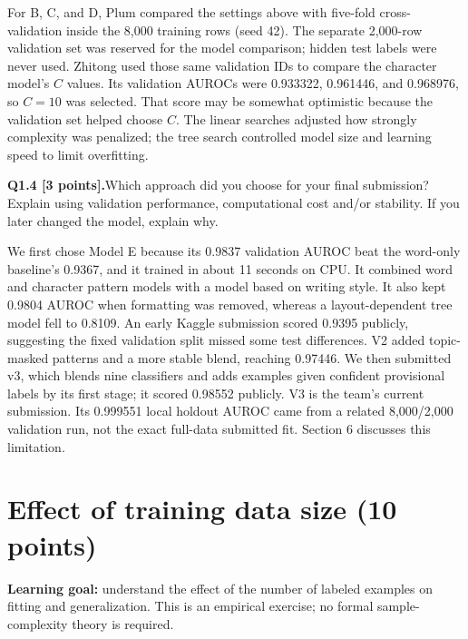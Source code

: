 \documentclass[11pt,letterpaper]{article}
\newcommand{\question}[2]{\needspace{4\baselineskip}\par\addvspace{0.45em}\noindent\textbf{#1}\quad #2\par\nobreak\vspace{0.1em}}
\begin{document}
For B, C, and D, Plum compared the settings above with five-fold cross-validation inside the 8,000 training rows (seed 42). The separate 2,000-row validation set was reserved for the model comparison; hidden test labels were never used. Zhitong used those same validation IDs to compare the character model's $C$ values. Its validation AUROCs were 0.933322, 0.961446, and 0.968976, so $C=10$ was selected. That score may be somewhat optimistic because the validation set helped choose $C$. The linear searches adjusted how strongly complexity was penalized; the tree search controlled model size and learning speed to limit overfitting.
\question{Q1.4 [3 points].}{Which approach did you choose for your final submission? Explain using validation performance, computational cost and/or stability. If you later changed the model, explain why.}
We first chose Model E because its 0.9837 validation AUROC beat the word-only baseline's 0.9367, and it trained in about 11 seconds on CPU. It combined word and character pattern models with a model based on writing style. It also kept 0.9804 AUROC when formatting was removed, whereas a layout-dependent tree model fell to 0.8109. An early Kaggle submission scored 0.9395 publicly, suggesting the fixed validation split missed some test differences. V2 added topic-masked patterns and a more stable blend, reaching 0.97446. We then submitted v3, which blends nine classifiers and adds examples given confident provisional labels by its first stage; it scored 0.98552 publicly. V3 is the team's current submission. Its 0.999551 local holdout AUROC came from a related 8,000/2,000 validation run, not the exact full-data submitted fit. Section 6 discusses this limitation.
\section{Effect of training data size (10 points)}
\textbf{Learning goal:} understand the effect of the number of labeled examples on fitting and generalization. This is an empirical exercise; no formal sample-complexity theory is required.
\end{document}
